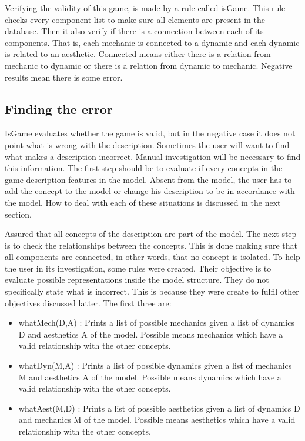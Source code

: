 Verifying the validity of this game, is made by a rule called isGame. This rule checks every component list to make sure all elements are present in the database. Then it also verify if there is a connection between each of its components. That is, each mechanic is connected to a dynamic and each dynamic is related to an aesthetic. Connected means either there is a relation from mechanic to dynamic or there is a relation from dynamic to mechanic. Negative results mean there is some error.

\subsection{Finding the error}

IsGame evaluates whether the game is valid, but in the negative case it does not point what is wrong with the description. Sometimes the user will want to find what makes a description incorrect. Manual investigation will be necessary to find this information. The first step should be to evaluate if every concepts in the game description features in the model. Absent from the model, the user has to add the concept to the model or change his description to be in accordance with the model. How to deal with each of these situations is discussed in the next section.

Assured that all concepts of the description are part of the model. The next step is to check the relationships between the concepts. This is done making sure that all components are connected, in other words, that no concept is isolated. To help the user in its investigation, some rules were created. Their objective is to evaluate possible representations inside the model structure. They do not specifically state what is incorrect. This is because they were create to fulfil other objectives discussed latter. The first three are:

\begin{itemize}
    \item whatMech(D,A) : Prints a list of possible mechanics given a list of dynamics D and aesthetics A of the model. Possible means mechanics which have a valid relationship with the other concepts.
    \item whatDyn(M,A) : Prints a list of possible dynamics given a list of mechanics M and aesthetics A of the model. Possible means dynamics which have a valid relationship with the other concepts.
    \item whatAest(M,D) : Prints a list of possible aesthetics given a list of dynamics D and mechanics M of the model. Possible means aesthetics which have a valid relationship with the other concepts.
\end{itemize}

